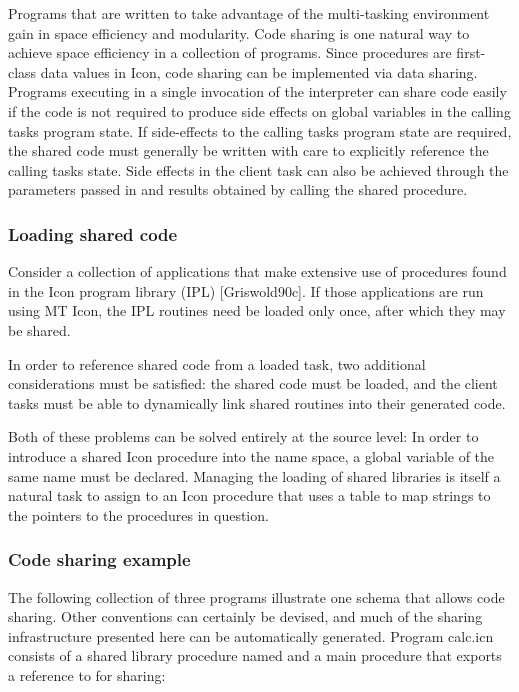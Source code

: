 Programs that are written to take advantage of the multi-tasking
environment gain in space efficiency and modularity. Code sharing is
one natural way to achieve space efficiency in a collection of
programs. Since procedures are first-class data values in Icon, code
sharing can be implemented via data sharing. Programs executing in a
single invocation of the interpreter can share code easily if the code
is not required to produce side effects on global variables in the
calling task{\textquotesingle}s program state. If side-effects to the
calling task{\textquotesingle}s program state are required, the shared
code must generally be written with care to explicitly reference the
calling task{\textquotesingle}s state. Side effects in the client task
can also be achieved through the parameters passed in and results
obtained by calling the shared procedure. 

\subsubsection{Loading shared code}

Consider a collection of applications that make extensive use of
procedures found in the Icon program library (IPL) [Griswold90c]. If
those applications are run using MT Icon, the IPL routines need be
loaded only once, after which they may be shared.

In order to reference shared code from a loaded task, two additional
considerations must be satisfied: the shared code must be loaded, and
the client tasks must be able to dynamically link shared routines into
their generated code.

Both of these problems can be solved entirely at the source level: In
order to introduce a shared Icon procedure into the name space, a
global variable of the same name must be declared. Managing the loading
of shared libraries is itself a natural task to assign to an Icon
procedure that uses a table to map strings to the pointers to the
procedures in question. 

\subsubsection{Code sharing example}

The following collection of three programs illustrate one schema that
allows code sharing. Other conventions can certainly be devised, and
much of the sharing infrastructure presented here can be automatically
generated. Program calc.icn consists of a shared library procedure
named  and a main procedure that
exports a reference to  for
sharing: 

